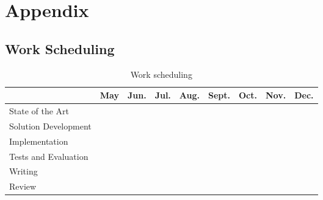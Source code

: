 
\section{Appendix} %
\label{sec:attachments}


\subsection{Work Scheduling} %
\label{sub:work_scheduling}
\begin{table}[hb!]
  \label{sub:work_scheduling}
  \label{tab:worktable}
  \begin{center}
    \begin{tabular}{|l||c|c|c|c|c|c|c|c|}
    \hline & \textbf{May} & \textbf{Jun.} & \textbf{Jul.} & \textbf{Aug.} & \textbf{Sept.} & \textbf{Oct.} & \textbf{Nov.} & \textbf{Dec.}\\
    \hline
    \hline
      State of the Art & \cellcolor{black!25} & \cellcolor{black!25} &   &   &  & &  &  \\
    \hline
      Solution Development & \cellcolor{black!25} & \cellcolor{black!25} &   &   &   & &  &  \\
    \hline
      Implementation &  & \cellcolor{black!25} & \cellcolor{black!25} & \cellcolor{black!25} & \cellcolor{black!25} &  &   &  \\
    \hline
      Tests and Evaluation &  &  &   &  & \cellcolor{black!25} & \cellcolor{black!25} &  &  \\
    \hline
      Writing &  & \cellcolor{black!25} & \cellcolor{black!25} & \cellcolor{black!25}  & \cellcolor{black!25} & \cellcolor{black!25} & \cellcolor{black!25} & \cellcolor{black!25} \\
    \hline
      Review &  &  &  &  &  & & \cellcolor{black!25} & \cellcolor{black!25} \\
    \hline
    \end{tabular}
    \caption{Work scheduling}
  \end{center}
\end{table}
